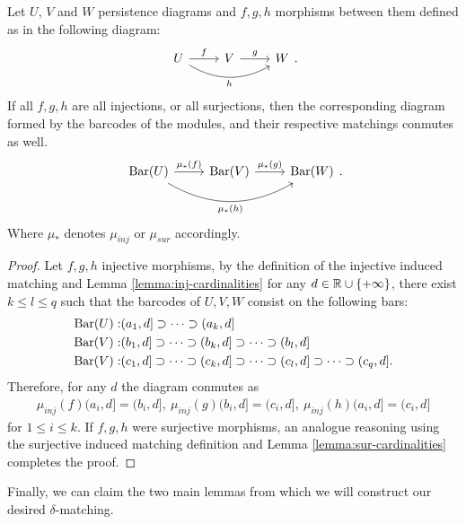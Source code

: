 \begin{lemma} \label{lemma:functoriality}
    Let $ U$, $V$ and $W$ persistence diagrams and $f, g, h$ morphisms between them defined as in the following diagram:
    $$
        \begin{tikzcd}
            U \arrow[r, "f"] \arrow[rr, "h"', bend right] & V \arrow[r, "g"] & W
        \end{tikzcd}.
    $$
    If all $ f, g, h$ are all injections, or all surjections, then the corresponding diagram formed by the barcodes of the modules, and their respective matchings conmutes as well.
    $$
        \begin{tikzcd}
            \barc(U) \arrow[r, "\mu_*(f)"] \arrow[rr, "\mu_*(h)"', bend right] & \barc(V) \arrow[r, "\mu_*(g)"] & \barc(W)
        \end{tikzcd}.
    $$
    Where $ \mu_* $ denotes $ \mu_{inj} $ or $ \mu_{sur} $ accordingly.
\end{lemma}
\begin{proof}
    Let $f, g, h$ injective morphisms, by the definition of the injective induced matching and Lemma \ref{lemma:inj-cardinalities} for any $ d \in \mathbb R \cup \{+ \infty\}$, there exist $ k \leq l \leq q $ such that the barcodes of $ U, V, W$ consist on the following bars:
    \begin{align*}
        \operatorname{Bar}(U):& (a_1, d] \supset \cdots \supset (a_k, d] \\
        \operatorname{Bar}(V):& (b_1, d] \supset \cdots \supset (b_k, d] \supset \cdots \supset (b_l, d] \\
        \operatorname{Bar}(V):& (c_1, d] \supset \cdots \supset (c_k, d] \supset \cdots \supset (c_l, d] \supset \cdots \supset (c_q, d]. \\
    \end{align*}
    Therefore, for any $ d $ the diagram conmutes as
    \begin{align*}
        \mu_{inj}(f)(a_i, d] = (b_i, d], \ \mu_{inj}(g)(b_i, d] = (c_i, d], \ \mu_{inj}(h)(a_i, d] = (c_i, d]
    \end{align*}
    for $ 1 \leq i \leq k$. If $f, g, h$ were surjective morphisms, an analogue reasoning using the surjective induced matching definition and Lemma \ref{lemma:sur-cardinalities} completes the proof.
\end{proof}

Finally, we can claim the two main lemmas from which we will construct our desired $\delta$-matching.

